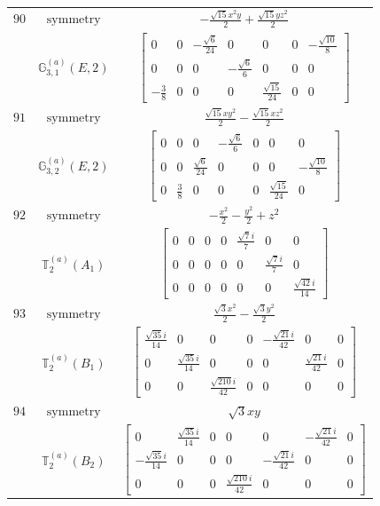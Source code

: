 \documentclass[fleqn,8pt,landscape]{jsarticle}
\begin{document}
\begin{longtable}{ccc}
$ 90 $ & $ \text{symmetry} $ & $ - \frac{\sqrt{15} x^{2} y}{2} + \frac{\sqrt{15} y z^{2}}{2} $ \\
$  $ & $ \mathbb{G}_{3,1}^{(a)}(E,2) $ & $ \begin{bmatrix} 0 & 0 & - \frac{\sqrt{6}}{24} & 0 & 0 & 0 & - \frac{\sqrt{10}}{8} \\ 0 & 0 & 0 & - \frac{\sqrt{6}}{6} & 0 & 0 & 0 \\ - \frac{3}{8} & 0 & 0 & 0 & \frac{\sqrt{15}}{24} & 0 & 0 \end{bmatrix} $ \\ \hline
$ 91 $ & $ \text{symmetry} $ & $ \frac{\sqrt{15} x y^{2}}{2} - \frac{\sqrt{15} x z^{2}}{2} $ \\
$  $ & $ \mathbb{G}_{3,2}^{(a)}(E,2) $ & $ \begin{bmatrix} 0 & 0 & 0 & - \frac{\sqrt{6}}{6} & 0 & 0 & 0 \\ 0 & 0 & \frac{\sqrt{6}}{24} & 0 & 0 & 0 & - \frac{\sqrt{10}}{8} \\ 0 & \frac{3}{8} & 0 & 0 & 0 & \frac{\sqrt{15}}{24} & 0 \end{bmatrix} $ \\ \hline
$ 92 $ & $ \text{symmetry} $ & $ - \frac{x^{2}}{2} - \frac{y^{2}}{2} + z^{2} $ \\
$  $ & $ \mathbb{T}_{2}^{(a)}(A_{1}) $ & $ \begin{bmatrix} 0 & 0 & 0 & 0 & \frac{\sqrt{7} i}{7} & 0 & 0 \\ 0 & 0 & 0 & 0 & 0 & \frac{\sqrt{7} i}{7} & 0 \\ 0 & 0 & 0 & 0 & 0 & 0 & \frac{\sqrt{42} i}{14} \end{bmatrix} $ \\ \hline
$ 93 $ & $ \text{symmetry} $ & $ \frac{\sqrt{3} x^{2}}{2} - \frac{\sqrt{3} y^{2}}{2} $ \\
$  $ & $ \mathbb{T}_{2}^{(a)}(B_{1}) $ & $ \begin{bmatrix} \frac{\sqrt{35} i}{14} & 0 & 0 & 0 & - \frac{\sqrt{21} i}{42} & 0 & 0 \\ 0 & \frac{\sqrt{35} i}{14} & 0 & 0 & 0 & \frac{\sqrt{21} i}{42} & 0 \\ 0 & 0 & \frac{\sqrt{210} i}{42} & 0 & 0 & 0 & 0 \end{bmatrix} $ \\ \hline
$ 94 $ & $ \text{symmetry} $ & $ \sqrt{3} x y $ \\
$  $ & $ \mathbb{T}_{2}^{(a)}(B_{2}) $ & $ \begin{bmatrix} 0 & \frac{\sqrt{35} i}{14} & 0 & 0 & 0 & - \frac{\sqrt{21} i}{42} & 0 \\ - \frac{\sqrt{35} i}{14} & 0 & 0 & 0 & - \frac{\sqrt{21} i}{42} & 0 & 0 \\ 0 & 0 & 0 & \frac{\sqrt{210} i}{42} & 0 & 0 & 0 \end{bmatrix} $ \\ \hline

\end{longtable}
\end{document}
